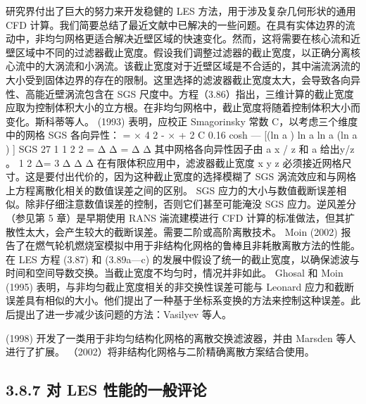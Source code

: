 \documentclass[11pt,a4paper,openany,fontset=none]{ctexbook}
\begin{document}
研究界付出了巨大的努力来开发稳健的 LES 方法，用于涉及复杂几何形状的通用 CFD 计算。我们简要总结了最近文献中已解决的一些问题。在具有实体边界的流动中，非均匀网格更适合解决近壁区域的快速变化。然而，这将需要在核心流和近壁区域中不同的过滤器截止宽度。假设我们调整过滤器的截止宽度，以正确分离核心流中的大涡流和小涡流。该截止宽度对于近壁区域是不合适的，其中湍流涡流的大小受到固体边界的存在的限制。这里选择的滤波器截止宽度太大，会导致各向异性、高能近壁涡流包含在 SGS 尺度中。方程（3.86）指出，三维计算的截止宽度应取为控制体积大小的立方根。在非均匀网格中，截止宽度将随着控制体积大小而变化。斯科蒂等人。 (1993) 表明，应校正 Smagorinsky 常数 C，以考虑三个维度中的网格 SGS 各向异性： = × 4 2 - × + 2 C 0.16 cosh — [(ln a ) ln a ln a (ln a ) ] SGS 27 1 1 2 2 = Δ Δ = Δ Δ 其中网格各向异性因子由 a x / z 和 a 给出y/z 。 1 2 Δ= 3 Δ Δ Δ 在有限体积应用中，滤波器截止宽度 x y z 必须接近网格尺寸。这是要付出代价的，因为这种截止宽度的选择模糊了 SGS 涡流效应和与网格上方程离散化相关的数值误差之间的区别。 SGS 应力的大小与数值截断误差相似。除非仔细注意数值误差的控制，否则它们甚至可能淹没 SGS 应力。逆风差分（参见第 5 章）是早期使用 RANS 湍流建模进行 CFD 计算的标准做法，但其扩散性太大，会产生较大的截断误差。需要二阶或高阶离散技术。 Moin (2002) 报告了在燃气轮机燃烧室模拟中用于非结构化网格的鲁棒且非耗散离散方法的性能。在 LES 方程 (3.87) 和 (3.89a—c) 的发展中假设了统一的截止宽度，以确保滤波与时间和空间导数交换。当截止宽度不均匀时，情况并非如此。 Ghosal 和 Moin (1995) 表明，与非均匀截止宽度相关的非交换性误差可能与 Leonard 应力和截断误差具有相似的大小。他们提出了一种基于坐标系变换的方法来控制这种误差。此后提出了进一步减少该问题的方法：Vasilyev 等人。

(1998) 开发了一类用于非均匀结构化网格的离散交换滤波器，并由 Marsden 等人进行了扩展。 （2002）将非结构化网格与二阶精确离散方案结合使用。

\subsection*{3.8.7 对 LES 性能的一般评论}
\end{document}
